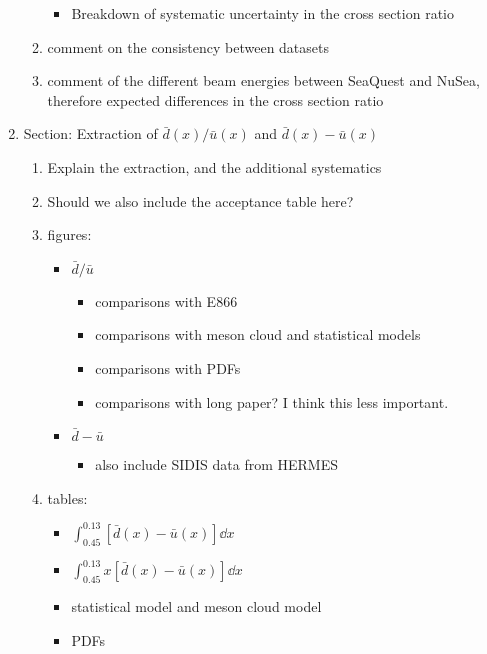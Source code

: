 \documentclass{article}
\begin{document}
\begin{enumerate}
\begin{enumerate}
\begin{itemize}
            \item Breakdown of systematic uncertainty in the cross section ratio
        \end{itemize}
        \item comment on the consistency between datasets
        \item comment of the different beam energies between SeaQuest and NuSea, therefore expected differences in the cross section ratio
    \end{enumerate}
    \item Section: Extraction of \texorpdfstring{$\bar{d}\left(x\right)/\bar{u}\left(x\right)$}{dbar(x)/ubar(x)}
	and \texorpdfstring{$\bar{d}\left(x\right)-\bar{u}\left(x\right)$}{dbar(x)-ubar(x)}
    \begin{enumerate}
        \item Explain the extraction, and the additional systematics
        \item Should we also include the acceptance table here?
        \item figures:
        \begin{itemize}
            \item $\bar{d}/\bar{u}$
            \begin{itemize}
                \item comparisons with E866
                \item comparisons with meson cloud and statistical models
                \item comparisons with PDFs
                \item comparisons with long paper? I think this less important.
            \end{itemize}
            \item $\bar{d}-\bar{u}$
            \begin{itemize}
                \item also include SIDIS data from HERMES
            \end{itemize}
        \end{itemize}
        \item tables:
        \begin{itemize}
            \item $\int_{0.45}^{0.13} \left[\bar{d}\left(x\right) - \bar{u}\left(x\right)\right] \dd{x}$
            \item $\int_{0.45}^{0.13} x\left[\bar{d}\left(x\right) - \bar{u}\left(x\right)\right] \dd{x}$
            \item statistical model and meson cloud model
            \item PDFs
        \end{itemize}
    \end{enumerate}
\end{enumerate}
\end{document}
